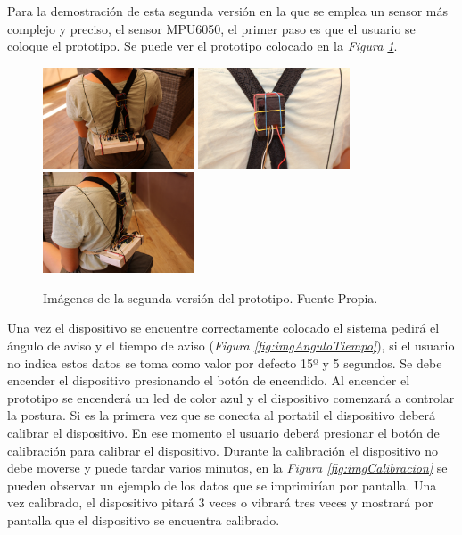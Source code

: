 Para la demostración de esta segunda versión en la que se emplea un sensor más complejo y preciso, el sensor MPU6050\cite{MPU6050_1,MPU6050_2}, el primer paso es que el usuario se coloque el prototipo. Se puede ver el prototipo colocado en la \textit{Figura \ref{fig:imgDispositivo_V2}}.

\begin{figure}[h!]
    \centering
    \includegraphics[width=0.4\textwidth]{img/Disp_V2_1.jpg}
    \includegraphics[width=0.4\textwidth]{img/Disp_V2_2.jpg}
    \includegraphics[width=0.4\textwidth]{img/Disp_V2_3.jpg}
    \caption{Imágenes de la segunda versión del prototipo. Fuente Propia.}
    \label{fig:imgDispositivo_V2} 
\end{figure}

Una vez el dispositivo se encuentre correctamente colocado el sistema pedirá el ángulo de aviso y el tiempo de aviso (\textit{Figura \ref{fig:imgAnguloTiempo}}), si el usuario no indica estos datos se toma como valor por defecto 15º y 5 segundos. Se debe encender el dispositivo presionando el botón de encendido. Al encender el prototipo se encenderá un led de color azul y el dispositivo comenzará a controlar la postura. Si es la primera vez que se conecta al portatil el dispositivo deberá calibrar el dispositivo. En ese momento el usuario deberá presionar el botón de calibración para calibrar el dispositivo. Durante la calibración el dispositivo no debe moverse y puede tardar varios minutos, en la \textit{Figura \ref{fig:imgCalibracion}} se pueden observar un ejemplo de los datos que se imprimirían por pantalla. Una vez calibrado, el dispositivo pitará 3 veces o vibrará tres veces y mostrará por pantalla que el dispositivo se encuentra calibrado.

